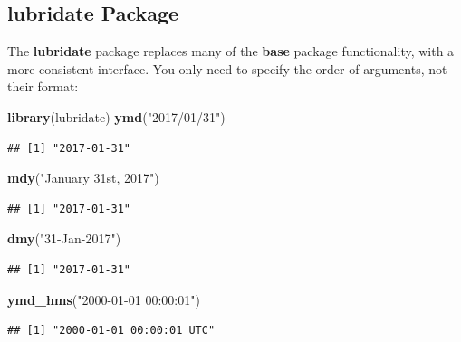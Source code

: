 \documentclass[]{book}
\newenvironment{Shaded}{\begin{snugshade}}{\end{snugshade}}
\newcommand{\KeywordTok}[1]{\textcolor[rgb]{0.13,0.29,0.53}{\textbf{#1}}}
\newcommand{\StringTok}[1]{\textcolor[rgb]{0.31,0.60,0.02}{#1}}
\newcommand{\NormalTok}[1]{#1}
\theoremstyle{definition}
\theoremstyle{definition}
\theoremstyle{definition}
\theoremstyle{remark}
\begin{document}
\subsection{lubridate Package}\label{lubridate-package}

The \textbf{lubridate} package replaces many of the \textbf{base}
package functionality, with a more consistent interface. You only need
to specify the order of arguments, not their format:

\begin{Shaded}
\begin{Highlighting}[]
\KeywordTok{library}\NormalTok{(lubridate)}
\KeywordTok{ymd}\NormalTok{(}\StringTok{"2017/01/31"}\NormalTok{)}
\end{Highlighting}
\end{Shaded}

\begin{verbatim}
## [1] "2017-01-31"
\end{verbatim}

\begin{Shaded}
\begin{Highlighting}[]
\KeywordTok{mdy}\NormalTok{(}\StringTok{"January 31st, 2017"}\NormalTok{)}
\end{Highlighting}
\end{Shaded}

\begin{verbatim}
## [1] "2017-01-31"
\end{verbatim}

\begin{Shaded}
\begin{Highlighting}[]
\KeywordTok{dmy}\NormalTok{(}\StringTok{"31-Jan-2017"}\NormalTok{)}
\end{Highlighting}
\end{Shaded}

\begin{verbatim}
## [1] "2017-01-31"
\end{verbatim}

\begin{Shaded}
\begin{Highlighting}[]
\KeywordTok{ymd_hms}\NormalTok{(}\StringTok{"2000-01-01 00:00:01"}\NormalTok{)}
\end{Highlighting}
\end{Shaded}

\begin{verbatim}
## [1] "2000-01-01 00:00:01 UTC"
\end{verbatim}
\end{document}
